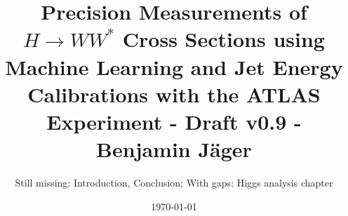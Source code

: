 

\endofdump


% 

\newif\ifIMAGES
\IMAGEStrue




\newcommand{\paperfiguredir}{figures/paper-figures}

\author{Still missing: Introduction, Conclusion; With gaps: Higgs analysis chapter}
\date{\today}
\title{Precision Measurements of $H \to WW^*$ Cross Sections using Machine Learning and Jet Energy Calibrations with the ATLAS Experiment - Draft v0.9 - Benjamin Jäger}





\maketitle





\tableofcontents


\newcommand{\chapterdir}{chapters}
%

% 

